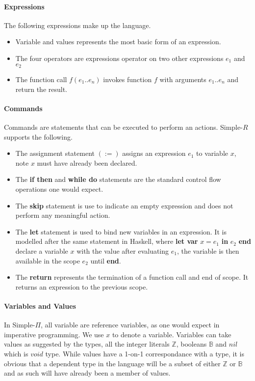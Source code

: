 \documentclass[a4paper,12pt]{report}
\begin{document}
\paragraph{Expressions} The following expressions make up the language.
\begin{itemize}
  \item Variable and values represents the most basic form of an expression.
  \item The four operators are expressions operator on two other expressions $e_1$ 
  and $e_2$
  \item The function call $f(e_1..e_n)$ invokes function $f$ with arguments 
  $e_1..e_n$ and return the result.
\end{itemize}

\paragraph{Commands} Commands are statements that can be executed to perform an 
actions. Simple-$R$ supports the following. 
\begin{itemize}
  \item The assignment statement $(:=)$ assigns an expression $e_1$ to variable 
  $x$, note $x$ must have already been declared. 
  \item The \textbf{if then} and \textbf{while do} statements are the standard 
  control flow operations one would expect.
  \item The \textbf{skip} statement is use to indicate an empty expression and 
  does not perform any meaningful action. 
  \item The \textbf{let} statement is used to bind new variables in an 
  expression. It is modelled after the same statement in Haskell, where \textbf{let var } 
  $x = e_1$ \textbf{in} $e_2$ \textbf{end} declare a variable $x$ with the value after 
  evaluating $e_1$, the variable is then available in the scope $e_2$ until 
  \textbf{end}.
  \item The \textbf{return} represents the termination of a function call and 
  end of scope. It returns an expression to the previous scope. 
\end{itemize}



\paragraph{Variables and Values} In Simple-$\Pi$, all variable are reference 
variables, as one would expect in imperative programming. We use $x$ to denote a 
variable. Variables can take values as suggested by the types, all the integer 
literals $\mathbb{Z}$, booleans $\mathbb{B}$ and $nil$ which is $void$ type. 
While values have a 1-on-1 correspondance with a type, it is obvious that a 
dependent type in the language will be a subset of either 
$\mathbb{Z}$ or $\mathbb{B}$ and as such will have already been a member of 
values.
\end{document}
